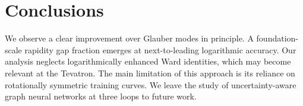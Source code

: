 \section{Conclusions}\label{sec:conclusions}

We observe a clear improvement over Glauber modes in principle. A
foundation-scale rapidity gap fraction emerges at next-to-leading
logarithmic accuracy. Our analysis neglects logarithmically enhanced
Ward identities, which may become relevant at the Tevatron. The main
limitation of this approach is its reliance on rotationally symmetric
training curves. We leave the study of uncertainty-aware graph neural
networks at three loops to future work.

